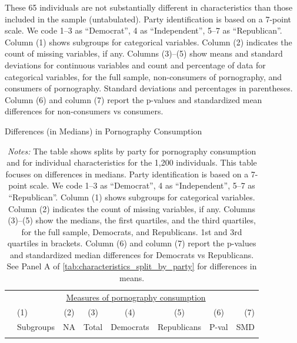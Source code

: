 \documentclass[12pt, letterpaper]{article}
\begin{document}
\begin{table}[ht]
{		These 65 individuals are not substantially different in characteristics than those included in the sample (untabulated).
		Party identification is based on a 7-point scale. We code 1--3 as ``Democrat'', 4 as ``Independent'', 5--7 as ``Republican''.
		Column (1) shows subgroups for categorical variables.
		Column (2) indicates the count of missing variables, if any.
		Columns (3)--(5) show means and standard deviations for continuous variables and count and percentage of data for categorical variables, for the full sample, non-consumers of pornography, and consumers of pornography.
		Standard deviations and percentages in parentheses.
		Column (6) and column (7) report the p-values and standardized mean differences for non-consumers vs consumers.
	}
\end{table}


\begin{table}[ht] \centering \small \setlength\tabcolsep{5 pt}
	\caption{Differences (in Medians) in Pornography Consumption}
	\label{tab:characteristics_split_by_party_medians}
	\begin{adjustbox}{max width=\textwidth}
		\begin{tabular}{@{\hspace{0\tabcolsep}}llrcccrr@{\hspace{0\tabcolsep}}}
			\toprule
			&\multicolumn{7}{c}{\underline{Measures of pornography consumption}}\\
			&\multicolumn{1}{l}{(1)}&\multicolumn{1}{c}{(2)}&\multicolumn{1}{c}{(3)}&\multicolumn{1}{c}{(4)}&\multicolumn{1}{c}{(5)}&\multicolumn{1}{c}{(6)}&\multicolumn{1}{r}{(7)}\\			
			&\multicolumn{1}{l}{Subgroups}&\multicolumn{1}{c}{NA}&\multicolumn{1}{c}{Total}&\multicolumn{1}{c}{Democrats}&\multicolumn{1}{c}{Republicans}&\multicolumn{1}{c}{P-val}&\multicolumn{1}{r}{SMD}\\
			\cmidrule{2-8}
			\\
			\bottomrule
		\end{tabular}
	\end{adjustbox}
	\caption*{\scriptsize \emph{Notes:}
		The table shows splits by party for pornography consumption and for individual characteristics for the 1,200 individuals.
		This table focuses on differences in medians.
		Party identification is based on a 7-point scale. We code 1--3 as ``Democrat'', 4 as ``Independent'', 5--7 as ``Republican''.
		Column (1) shows subgroups for categorical variables.
		Column (2) indicates the count of missing variables, if any.
		Columns (3)--(5) show the medians, the first quartiles, and the third quartiles, for the full sample, Democrats, and Republicans.
		1st and 3rd quartiles in brackets.
		Column (6) and column (7) report the p-values and standardized median differences for Democrats vs Republicans.
		See Panel A of \cref{tab:characteristics_split_by_party} for differences in means.
	}
\end{table}
\end{document}
